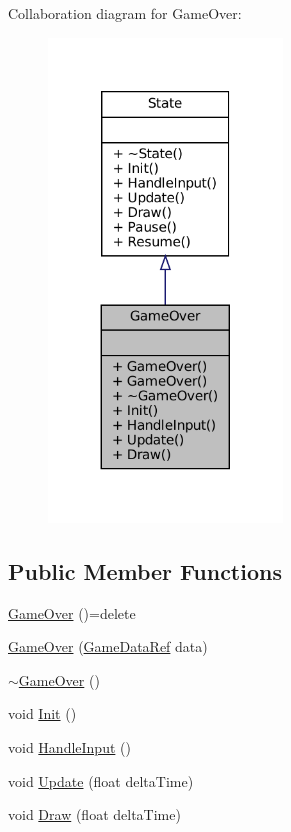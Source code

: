 Collaboration diagram for Game\+Over\+:\nopagebreak
\begin{figure}[H]
\begin{center}
\leavevmode
\includegraphics[width=176pt]{classGameOver__coll__graph}
\end{center}
\end{figure}
\subsection*{Public Member Functions}
\begin{DoxyCompactItemize}
\item 
\mbox{\hyperlink{classGameOver_a191161f50e27feba1a5fd18aa867fbf2}{Game\+Over}} ()=delete
\item 
\mbox{\hyperlink{classGameOver_a2ed53e8b1c1fe4e8e73d88fbb548da5a}{Game\+Over}} (\mbox{\hyperlink{Game_8h_aff850703a7797c8bfee2f02906aec50c}{Game\+Data\+Ref}} data)
\item 
\mbox{\hyperlink{classGameOver_ae36951a153d25d52fab7cbc7a85bbbbd}{$\sim$\+Game\+Over}} ()
\item 
void \mbox{\hyperlink{classGameOver_ac13d1bd0fe9f8db0ef0301c9ec63a9e0}{Init}} ()
\item 
void \mbox{\hyperlink{classGameOver_a1b90d0ed04386fe166cbfcf2427a5175}{Handle\+Input}} ()
\item 
void \mbox{\hyperlink{classGameOver_a960c8ff2705f1fe49b49c717ee68fbc6}{Update}} (float delta\+Time)
\item 
void \mbox{\hyperlink{classGameOver_a263a49026ce81b22721cfc515f8efd4e}{Draw}} (float delta\+Time)
\end{DoxyCompactItemize}


